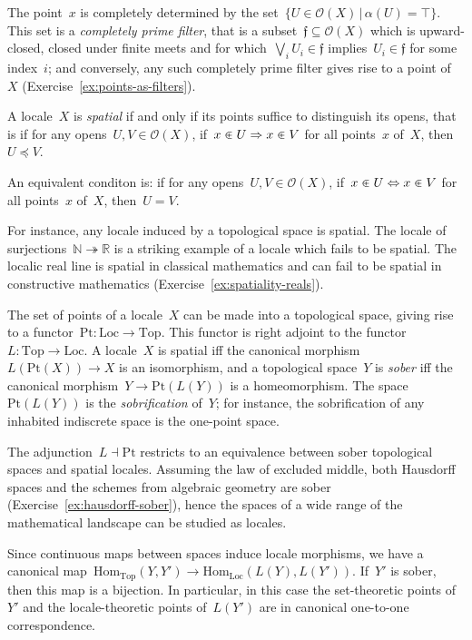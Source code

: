 \documentclass{ws-rv9x6}
\renewcommand{\O}{\mathcal{O}}
\newcommand{\NN}{\mathbb{N}}
\newcommand{\RR}{\mathbb{R}}
\newcommand{\fff}{\mathfrak{f}}
\newcommand{\Hom}{\mathrm{Hom}}
\renewcommand{\_}{\mathpunct{.}}
\newcommand{\?}{\,{:}\,}
\newcommand{\Pt}{\mathrm{Pt}}
\newcommand{\Loc}{\mathrm{Loc}}
\newcommand{\Top}{\mathrm{Top}}
\begin{document}
The point~$x$ is completely determined by the
set~$\{ U \in \O(X) \,|\, \alpha(U) = \top \}$. This set is a \emph{completely
prime filter}, that is a subset~$\fff \subseteq \O(X)$ which is upward-closed,
closed under finite meets and for which~$\bigvee_i U_i \in \fff$ implies~$U_i
\in \fff$ for some index~$i$; and conversely, any such completely prime filter
gives rise to a point of~$X$ (Exercise~\ref{ex:points-as-filters}).

\begin{definition}A locale~$X$ is \emph{spatial} if and only if its points
suffice to distinguish its opens, that is if for any opens~$U, V \in \O(X)$,
if~$x \inplus U \Rightarrow x \inplus V$ for all points~$x$ of~$X$, then~$U
\preceq V$.\end{definition}

An equivalent conditon is: if for any opens~$U, V \in \O(X)$, if~$x \inplus U
\Leftrightarrow x \inplus V$ for all points~$x$ of~$X$, then~$U = V$.

For instance, any locale induced by a topological space is spatial. The locale
of surjections~$\NN \twoheadrightarrow \RR$ is a striking example of a locale which fails to be
spatial. The localic real line is spatial in classical mathematics and can
fail to be spatial in constructive mathematics (Exercise~\ref{ex:spatiality-reals}).

\begin{remark}\label{rem:definition-sober}
The set of points of a locale~$X$ can be made into a topological space, giving
rise to a functor~$\Pt : \Loc \to \Top$. This functor is right adjoint
to the functor~$L : \Top \to \Loc$. A locale~$X$ is spatial iff the canonical
morphism~$L(\Pt(X)) \to X$ is an isomorphism, and a topological space~$Y$
is \emph{sober} iff the canonical morphism~$Y \to \Pt(L(Y))$ is a
homeomorphism. The space~$\Pt(L(Y))$ is the \emph{sobrification} of~$Y$; for
instance, the sobrification of any inhabited indiscrete space is the one-point
space.

The adjunction~$L \dashv \Pt$ restricts to an equivalence between sober
topological spaces and spatial locales. Assuming the law of excluded middle,
both Hausdorff spaces and the schemes from algebraic geometry are sober
(Exercise~\ref{ex:hausdorff-sober}), hence the spaces of a wide
range of the mathematical landscape can be studied as locales.\end{remark}

\begin{remark}\label{rem:sober-embed}
Since continuous maps between spaces induce locale morphisms, we
have a canonical map~$\Hom_\Top(Y,Y') \to \Hom_\Loc(L(Y),L(Y'))$. If~$Y'$ is
sober, then this map is a bijection. In particular, in this case the set-theoretic points
of~$Y'$ and the locale-theoretic points of~$L(Y')$ are in canonical
one-to-one correspondence.
\end{remark}
\end{document}
